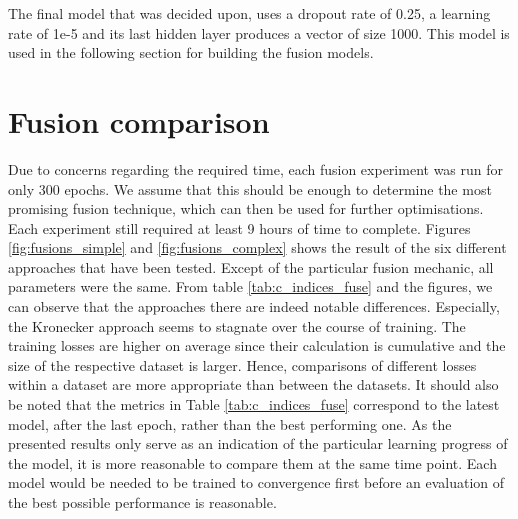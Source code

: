 The final model that was decided upon, uses a dropout rate of 0.25, a learning rate of 1e-5 and its last hidden layer produces a vector of size 1000. This model is used in the following section for building the fusion models.

\clearpage

\section{Fusion comparison}

Due to concerns regarding the required time, each fusion experiment was run for only 300 epochs. We assume that this should be enough to determine the most promising fusion technique, which can then be used for further optimisations. Each experiment still required at least 9 hours of time to complete.
Figures \ref{fig:fusions_simple} and \ref{fig:fusions_complex} shows the result of the six different approaches that have been tested. Except of the particular fusion mechanic, all parameters were the same. From table \ref{tab:c_indices_fuse} and the figures, we can observe that the approaches there are indeed notable differences. Especially, the Kronecker approach seems to stagnate over the course of training. 
The training losses are higher on average since their calculation is cumulative and the size of the respective dataset is larger. Hence, comparisons of different losses within a dataset are more appropriate than between the datasets. 
It should also be noted that the metrics in Table \ref{tab:c_indices_fuse} correspond to the latest model, after the last epoch, rather than the best performing one. As the presented results only serve as an indication of the particular learning progress of the model, it is more reasonable to compare them at the same time point. Each model would be needed to be trained to convergence first before an evaluation of the best possible performance is reasonable. 


